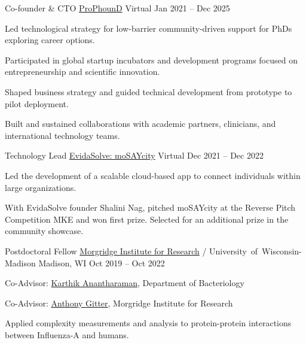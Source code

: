 \begin{cventries}
\cventry
    {Co-founder \& CTO}
    {\href{https://www.pro-phound.com/}{ProPhounD}}
    {Virtual}
    {Jan 2021 -- Dec 2025}
    {
    \begin{cvitems}
      \item {Led technological strategy for low-barrier community-driven support for PhDs exploring career options.}
      \item {Participated in global startup incubators and development programs focused on entrepreneurship and scientific innovation.}
      \item {Shaped business strategy and guided technical development from prototype to pilot deployment.}
      \item {Built and sustained collaborations with academic partners, clinicians, and international technology teams.}
    \end{cvitems}
    }

\cventry
    {Technology Lead}
    {\href{https://www.evidasolve.com/mosaycity}{EvidaSolve: moSAYcity}}
    {Virtual}
    {Dec 2021 -- Dec 2022}
    {
    \begin{cvitems}
       \item {Led the development of a scalable cloud-based app to connect individuals within large organizations.}
       \item {With EvidaSolve founder Shalini Nag, pitched moSAYcity at the Reverse Pitch Competition MKE and won first prize. Selected for an additional prize in the community showcase.}
    \end{cvitems}
    }

\cventry
    {Postdoctoral Fellow}
    {\href{https://morgridge.org/}{Morgridge Institute for Research} / University~of~Wisconsin-Madison}
    {Madison, WI}
    {Oct 2019 -- Oct 2022}
    {
    \begin{cvitems}
       \item {Co-Advisor: \href{https://anantharamanlab.com/}{Karthik Anantharaman}, Department of Bacteriology}
       \item {Co-Advisor: \href{https://www.biostat.wisc.edu/~gitter/}{Anthony Gitter}, Morgridge Institute for Research}
       \item {Applied complexity measurements and analysis to protein-protein interactions between Influenza-A and humans.}
    \end{cvitems}
    }


\end{cventries}

